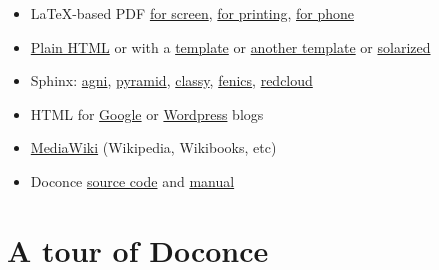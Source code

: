 \documentclass[%
oneside,                 %
final,                   %
chapterprefix=true,      %
open=right               %
10pt]{book}
\begin{document}
\begin{itemize}
 \item LaTeX-based PDF \href{{http://hplgit.github.com/teamods/writing_reports/_static/report.pdf}}{for screen}, \href{{http://hplgit.github.com/teamods/writing_reports/_static/report_4printing.pdf}}{for printing}, \href{{http://hplgit.github.com/teamods/writing_reports/_static/report_4phone.pdf}}{for phone}

 \item \href{{http://hplgit.github.com/teamods/writing_reports/_static/report_do.html}}{Plain HTML} or with a \href{{http://hplgit.github.com/teamods/writing_reports/_static/report_vagrant.html}}{template} or \href{{http://hplgit.github.com/teamods/writing_reports/_static/report_github_minimal.html}}{another template} or \href{{http://hplgit.github.com/teamods/writing_reports/_static/report_solarized.html}}{solarized}

 \item Sphinx: \href{{http://hplgit.github.com/teamods/writing_reports/_static/sphinx-agni/index.html}}{agni}, \href{{http://hplgit.github.com/teamods/writing_reports/_static/sphinx-pyramid/report.html}}{pyramid}, \href{{http://hplgit.github.com/teamods/writing_reports/_static/sphinx-classy/report.html}}{classy}, \href{{http://hplgit.github.com/teamods/writing_reports/_static/sphinx-fenics_minimal/report.html}}{fenics}, \href{{http://hplgit.github.com/teamods/writing_reports/_static/sphinx-fenics_minimal/report.html}}{redcloud}

 \item HTML for \href{{http://doconce-report-demo.blogspot.no/}}{Google} or \href{{http://doconcereportdemo.wordpress.com/}}{Wordpress} blogs

 \item \href{{http://doconcedemo.shoutwiki.com/wiki/Doconce_demo_page}}{MediaWiki} (Wikipedia, Wikibooks, etc)

 \item Doconce \href{{http://hplgit.github.com/teamods/writing_reports/_static/report.do.txt.html}}{source code} and \href{{http://hplgit.github.io/doconce/doc/pub/manual/html/manual.html}}{manual}
\end{itemize}

\noindent

\section{A tour of Doconce}
\end{document}
